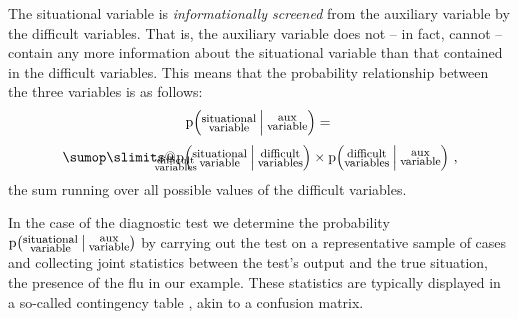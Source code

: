 \documentclass[\ifafour a4paper,12pt,\else a5paper,10pt,\fi%
onecolumn,oneside,article,%
british%
]{memoir}
\makeatletter
\theoremstyle{remark}
\theoremstyle{innote}
\def\sum{\DOTSI\sumop\slimits@}
\newcommand*{\p}{\mathrm{p}}%
\renewcommand*{\|}[1][]{\nonscript\:#1\vert\nonscript\:\mathopen{}}
\makeatother
\begin{document}
The situational variable is \emph{informationally screened} from the auxiliary variable by the difficult variables. That is, the auxiliary variable does not -- in fact, cannot -- contain any more information about the situational variable than that contained in the difficult variables. This means that the probability relationship between the three variables is as follows:
\begin{multline}
  \label{eq:screening}
  \p\Bigl(
  \text{\parbox[c]{\widthof{\footnotesize situational}}{\centering\footnotesize situational\\[-1\jot]variable}}
  \|[\Big]
  \text{\parbox[c]{\widthof{\footnotesize variable}}{\centering\footnotesize aux\\[-1\jot]variable}}
  \Bigr)
  ={}\\[\jot]
\sum_{\mathclap{
    \text{\parbox[c]{\widthof{\scriptsize variables}}{\centering\scriptsize difficult\\[-1\jot]variables}}
}}
\p\Bigr(
  \text{\parbox[c]{\widthof{\footnotesize situational}}{\centering\footnotesize situational\\[-1\jot]variable}}
  \|[\Big]
  \text{\parbox[c]{\widthof{\footnotesize variables}}{\centering\footnotesize difficult\\[-1\jot]variables}}
  \Bigr)  \times
  \p\Bigl(
  \text{\parbox[c]{\widthof{\footnotesize variables}}{\centering\footnotesize difficult\\[-1\jot]variables}}
  \|[\Big]
  \text{\parbox[c]{\widthof{\footnotesize variable}}{\centering\footnotesize aux\\[-1\jot]variable}}
\Bigr)   \ ,
\end{multline}
the sum running over all possible values of the difficult variables.

In the case of the diagnostic test we determine the probability %
$\p\bigl(%
\text{\parbox[c]{\widthof{\footnotesize situational}}{\centering\footnotesize situational\\[-1\jot]variable}}%
\|[\big]%
\text{\parbox[c]{\widthof{\footnotesize variable}}{\centering\footnotesize aux\\[-1\jot]variable}}%
\bigr)$ %
by carrying out the test on a representative sample of cases and collecting joint statistics between the test's output and the true situation, the presence of the flu in our example. These statistics are typically displayed in a so-called contingency table \autocites{fienberg1980_r2007,mostelleretal1983_r2013}, akin to a confusion matrix. %
\end{document}

